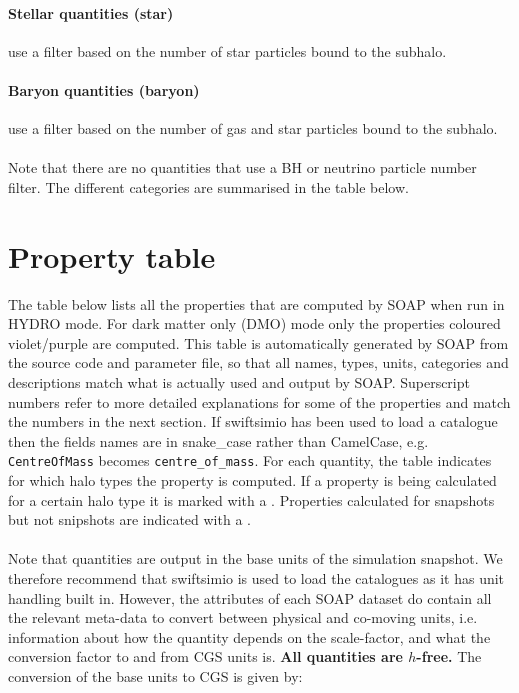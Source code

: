 \documentclass{article}
\begin{document}
\paragraph{Stellar quantities (star)} use a filter based on the number of star particles bound to the 
subhalo.

\paragraph{Baryon quantities (baryon)} use a filter based on the number of gas and star particles 
bound to the subhalo.

\paragraph{}Note that there are no quantities that use a BH or neutrino particle number filter.
The different categories are summarised in the table below.



\section{Property table}

The table below lists all the properties that are computed by SOAP when run in HYDRO mode.
For dark matter only (DMO) mode only the properties coloured violet/purple are computed.
This table is automatically generated by SOAP from the source code and parameter file, so that all
names, types, units, categories and descriptions match what is actually
used and output by SOAP.
Superscript numbers refer to more detailed explanations for some of the properties and match the numbers in
the next section. If swiftsimio has been used to load a catalogue then the fields names are in snake\_case rather
than CamelCase, e.g. \verb+CentreOfMass+ becomes \verb+centre_of_mass+. For each quantity, the table
indicates for which halo types the property is computed. If a property is being calculated 
for a certain halo type it is marked with a . Properties calculated
for snapshots but not snipshots are indicated with a .

\paragraph{}Note that quantities are output in the base units of the simulation snapshot. 
We therefore recommend that swiftsimio is used to load the catalogues as it has unit handling built in.
However, the attributes of each SOAP dataset do contain all the relevant meta-data to convert between physical
and co-moving units, i.e. information about how the
quantity depends on the scale-factor, and what the conversion factor to and from CGS units is. \textbf{All quantities
are $h$-free.} The conversion of the base units to CGS is given by:
\end{document}
